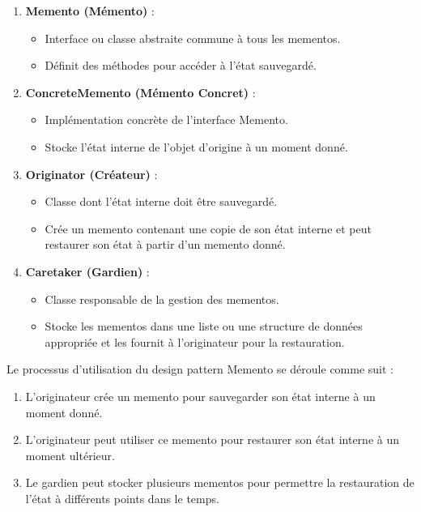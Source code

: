 \documentclass[french]{article}
\begin{document}
\begin{enumerate}
    \item \textbf{Memento (Mémento)} :
    \begin{itemize}
        \item Interface ou classe abstraite commune à tous les mementos.
        \item Définit des méthodes pour accéder à l'état sauvegardé.
    \end{itemize}
    
    \item \textbf{ConcreteMemento (Mémento Concret)} :
    \begin{itemize}
        \item Implémentation concrète de l'interface Memento.
        \item Stocke l'état interne de l'objet d'origine à un moment donné.
    \end{itemize}
    
    \item \textbf{Originator (Créateur)} :
    \begin{itemize}
        \item Classe dont l'état interne doit être sauvegardé.
        \item Crée un memento contenant une copie de son état interne et peut restaurer son état à partir d'un memento donné.
    \end{itemize}
    
    \item \textbf{Caretaker (Gardien)} :
    \begin{itemize}
        \item Classe responsable de la gestion des mementos.
        \item Stocke les mementos dans une liste ou une structure de données appropriée et les fournit à l'originateur pour la restauration.
    \end{itemize}
\end{enumerate}

Le processus d'utilisation du design pattern Memento se déroule comme suit :

\begin{enumerate}
    \item L'originateur crée un memento pour sauvegarder son état interne à un moment donné.
    \item L'originateur peut utiliser ce memento pour restaurer son état interne à un moment ultérieur.
    \item Le gardien peut stocker plusieurs mementos pour permettre la restauration de l'état à différents points dans le temps.
\end{enumerate}
\end{document}
